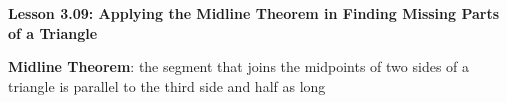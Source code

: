 \begin{center}
\textbf{Lesson 3.09: Applying the Midline Theorem in Finding Missing Parts of a Triangle}
\end{center}

\vspace*{-1.5ex}

\noindent\textbf{Midline Theorem}: the segment that joins the midpoints of two
sides of a triangle is parallel to the third side and half as long


